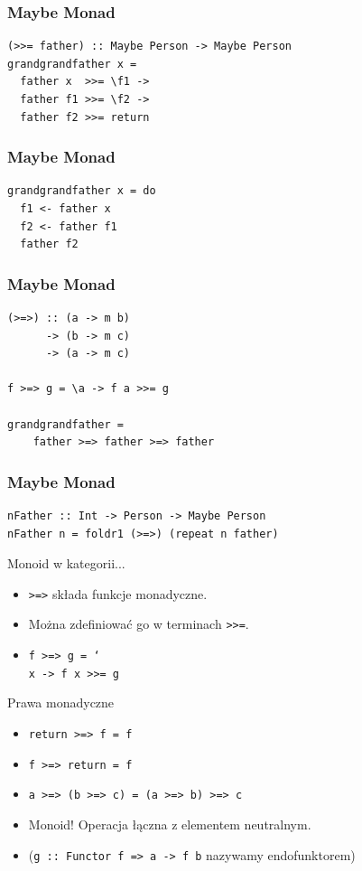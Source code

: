 \documentclass[14pt]{beamer}
\begin{document}
\begin{frame}[fragile]
\frametitle{Maybe Monad}
\begin{verbatim}
(>>= father) :: Maybe Person -> Maybe Person
grandgrandfather x =
  father x  >>= \f1 ->
  father f1 >>= \f2 ->
  father f2 >>= return
\end{verbatim}
\end{frame}

\begin{frame}[fragile]
\frametitle{Maybe Monad}
\begin{verbatim}
grandgrandfather x = do
  f1 <- father x
  f2 <- father f1
  father f2
\end{verbatim}
\end{frame}

\begin{frame}[fragile]
\frametitle{Maybe Monad}
\begin{verbatim}
(>=>) :: (a -> m b)
      -> (b -> m c)
      -> (a -> m c)

f >=> g = \a -> f a >>= g

grandgrandfather =
    father >=> father >=> father
\end{verbatim}
\end{frame}

\begin{frame}[fragile]
\frametitle{Maybe Monad}
\begin{verbatim}
nFather :: Int -> Person -> Maybe Person
nFather n = foldr1 (>=>) (repeat n father)
\end{verbatim}
\end{frame}

\begin{frame}{Monoid w kategorii...}
    \begin{itemize}
        \item \texttt{>=>} składa funkcje monadyczne.
        \item Można zdefiniować go w terminach \texttt{>>=}.
        \item \texttt{f >=> g = \char`\\x -> f x >>= g}
    \end{itemize}
\end{frame}

\begin{frame}{Prawa monadyczne}
    \begin{itemize}
        \item \texttt{return >=> f = f}
        \item \texttt{f >=> return = f}
        \item \texttt{a >=> (b >=> c) = (a >=> b) >=> c}
        \pause
        \item Monoid! Operacja łączna z elementem neutralnym.
        \item (\texttt{g :: Functor f => a -> f b} nazywamy endofunktorem)
    \end{itemize}
\end{frame}
\end{document}
